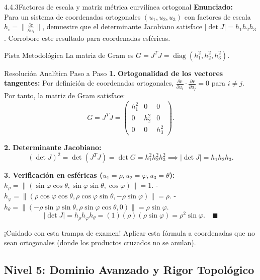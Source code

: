 \documentclass[11pt,a4paper]{article}
\begin{document}
\begin{nivelbox}{4.4.3}{Factores de escala y matriz métrica curvilínea ortogonal}
\textbf{Enunciado:}\\
Para un sistema de coordenadas ortogonales $(u_1, u_2, u_3)$ con factores de escala $h_i = \|\frac{\partial \mathbf{r}}{\partial u_i}\|$, demuestre que el determinante Jacobiano satisface $|\det J| = h_1 h_2 h_3$. Corrobore este resultado para coordenadas esféricas.

\begin{observacionbox}{Pista Metodológica}
La matriz de Gram es $G = J^T J = \operatorname{diag}(h_1^2, h_2^2, h_3^2)$.
\end{observacionbox}

\begin{ejerciciobox}{Resolución Analítica Paso a Paso}
\smallskip\noindent\textbf{1.} \textbf{Ortogonalidad de los vectores tangentes:}
Por definición de coordenadas ortogonales, $\frac{\partial \mathbf{r}}{\partial u_i} \cdot \frac{\partial \mathbf{r}}{\partial u_j} = 0$ para $i \neq j$.
Por tanto, la matriz de Gram satisface:
\[G = J^T J = \begin{pmatrix} h_1^2 & 0 & 0 \\ 0 & h_2^2 & 0 \\ 0 & 0 & h_3^2 \end{pmatrix}.\]

\smallskip\noindent\textbf{2.} \textbf{Determinante Jacobiano:}
\[(\det J)^2 = \det(J^T J) = \det G = h_1^2 h_2^2 h_3^2 \implies |\det J| = h_1 h_2 h_3.\]

\smallskip\noindent\textbf{3.} \textbf{Verificación en esféricas ($u_1 = \rho, u_2 = \varphi, u_3 = \theta$):}
- $h_\rho = \|(\sin\varphi\cos\theta, \sin\varphi\sin\theta, \cos\varphi)\| = 1$.
- $h_\varphi = \|(\rho\cos\varphi\cos\theta, \rho\cos\varphi\sin\theta, -\rho\sin\varphi)\| = \rho$.
- $h_\theta = \|(-\rho\sin\varphi\sin\theta, \rho\sin\varphi\cos\theta, 0)\| = \rho\sin\varphi$.
\[|\det J| = h_\rho h_\varphi h_\theta = (1)(\rho)(\rho\sin\varphi) = \rho^2 \sin\varphi. \quad \blacksquare\]
\end{ejerciciobox}

\begin{errorbox}{¡Cuidado con esta trampa de examen!}
Aplicar esta fórmula a coordenadas que no sean ortogonales (donde los productos cruzados no se anulan).
\end{errorbox}
\end{nivelbox}
\bigskip

\subsection{Nivel 5: Dominio Avanzado y Rigor Topológico}
\end{document}
